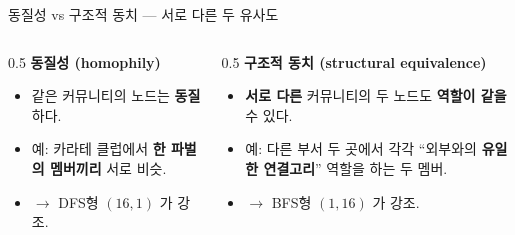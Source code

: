 \begin{frame}{동질성 vs 구조적 동치 --- 서로 다른 두 유사도}
  \small
  \begin{columns}[T]
    \begin{column}{0.5\textwidth}
      \textbf{\color{ksablue}동질성 (homophily)}
      \begin{itemize}
        \item 같은 커뮤니티의 노드는 \textbf{동질}하다.
        \item 예: 카라테 클럽에서 \textbf{한 파벌의 멤버끼리}
          서로 비슷.
        \item $\to$ DFS형 $(16,1)$ 가 강조.
      \end{itemize}
    \end{column}
    \begin{column}{0.5\textwidth}
      \textbf{\color{ksablue}구조적 동치 (structural equivalence)}
      \begin{itemize}
        \item \textbf{서로 다른} 커뮤니티의 두 노드도 \textbf{역할이
          같을} 수 있다.
        \item 예: 다른 부서 두 곳에서 각각 ``외부와의 \textbf{유일한
          연결고리}'' 역할을 하는 두 멤버.
        \item $\to$ BFS형 $(1,16)$ 가 강조.
      \end{itemize}
    \end{column}
  \end{columns}
\end{frame}
